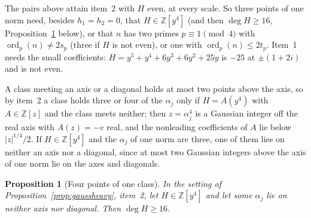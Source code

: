 \documentclass[11pt]{article}
\newtheorem{proposition}[theorem]{Proposition}
\begin{document}
The pairs above attain item~2 with $H$ even, at every scale.  So three
points of one norm need, besides $h_1=h_2=0$, that $H\in\mathbb Z[y^4]$
(and then $\deg H\ge16$, Proposition~\ref{prop:gaussfour} below), or
that $n$ has two primes $p\equiv1\pmod4$ with
$\operatorname{ord}_p(n)\ne2s_p$ (three if $H$ is not even), or one with
$\operatorname{ord}_p(n)\le2t_p$.  Item~1 needs
the small coefficients: $H=y^5+y^4+6y^3+6y^2+25y$ is $-25$ at $\pm(1+2i)$
and is not even.

A class meeting an axis or a diagonal holds at most two points above the
axis, so by item~2 a class holds three or four of the $\alpha_j$ only if
$H=A(y^4)$ with $A\in\mathbb Z[z]$ and the class meets neither; then
$z=\alpha_j^4$ is a Gaussian integer off the real axis with $A(z)=-v$ real,
and the nonleading coefficients of $A$ lie below $|z|^{1/4}/2$.  If $H\in\mathbb
Z[y^4]$ and the $\alpha_j$ of one norm are three, one of them lies on neither
an axis nor a diagonal, since at most two Gaussian integers above the axis of one norm lie on the
axes and diagonals.

\begin{proposition}[Four points of one class]\label{prop:gaussfour}
In the setting of Proposition~\ref{prop:gaussheavy}, item~2, let
$H\in\mathbb Z[y^4]$ and let some $\alpha_j$ lie on neither axis nor
diagonal.  Then $\deg H\ge16$.
\end{proposition}
\end{document}

